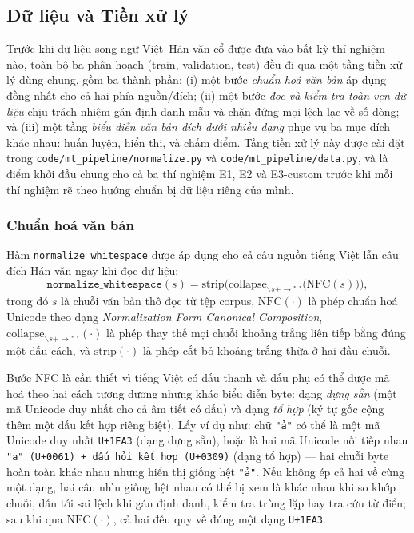 \subsection{Dữ liệu và Tiền xử lý}

Trước khi dữ liệu song ngữ Việt--Hán văn cổ được đưa vào bất kỳ thí nghiệm nào, toàn bộ
ba phân hoạch (train, validation, test) đều đi qua một tầng tiền xử lý dùng chung, gồm
ba thành phần: (i) một bước \textit{chuẩn hoá văn bản} áp dụng đồng nhất cho cả hai phía
nguồn/đích; (ii) một bước \textit{đọc và kiểm tra toàn vẹn dữ liệu} chịu trách nhiệm gán
định danh mẫu và chặn đứng mọi lệch lạc về số dòng; và (iii) một tầng \textit{biểu diễn
văn bản đích dưới nhiều dạng} phục vụ ba mục đích khác nhau: huấn luyện, hiển thị, và
chấm điểm. Tầng tiền xử lý này được cài đặt trong \texttt{code/mt\_pipeline/normalize.py}
và \texttt{code/mt\_pipeline/data.py}, và là điểm khởi đầu chung cho cả ba thí nghiệm E1,
E2 và E3-custom trước khi mỗi thí nghiệm rẽ theo hướng chuẩn bị dữ liệu riêng của mình.

\subsubsection{Chuẩn hoá văn bản}

Hàm \texttt{normalize\_whitespace} được áp dụng cho cả câu nguồn tiếng Việt lẫn câu đích
Hán văn ngay khi đọc dữ liệu:
\begin{equation}
  \texttt{normalize\_whitespace}(s) = \mathrm{strip}\Big(\mathrm{collapse}_{\backslash s+ \to \text{"~"}}\big(\mathrm{NFC}(s)\big)\Big),
  \label{eq:normalize-whitespace}
\end{equation}
trong đó $s$ là chuỗi văn bản thô đọc từ tệp corpus, $\mathrm{NFC}(\cdot)$ là phép chuẩn
hoá Unicode theo dạng \textit{Normalization Form Canonical Composition},
$\mathrm{collapse}_{\backslash s+ \to \text{"~"}}(\cdot)$ là phép thay thế mọi chuỗi
khoảng trắng liên tiếp bằng đúng một dấu cách, và $\mathrm{strip}(\cdot)$ là phép cắt bỏ
khoảng trắng thừa ở hai đầu chuỗi.

Bước NFC là cần thiết vì tiếng Việt có dấu thanh và dấu phụ có thể được mã hoá theo hai
cách tương đương nhưng khác biểu diễn byte: dạng \textit{dựng sẵn} (một mã Unicode duy
nhất cho cả âm tiết có dấu) và dạng \textit{tổ hợp} (ký tự gốc cộng thêm một dấu kết hợp
riêng biệt). Lấy ví dụ như: chữ \texttt{"ả"} có thể là một mã Unicode duy nhất
\texttt{U+1EA3} (dạng dựng sẵn), hoặc là hai mã Unicode nối tiếp nhau
\texttt{"a" (U+0061) + dấu hỏi kết hợp (U+0309)} (dạng tổ hợp) — hai chuỗi byte hoàn
toàn khác nhau nhưng hiển thị giống hệt \texttt{"ả"}. Nếu không ép cả hai về cùng một
dạng, hai câu nhìn giống hệt nhau có thể bị xem là khác nhau khi so khớp chuỗi, dẫn tới
sai lệch khi gán định danh, kiểm tra trùng lặp hay tra cứu từ điển; sau khi qua
$\mathrm{NFC}(\cdot)$, cả hai đều quy về đúng một dạng \texttt{U+1EA3}.

